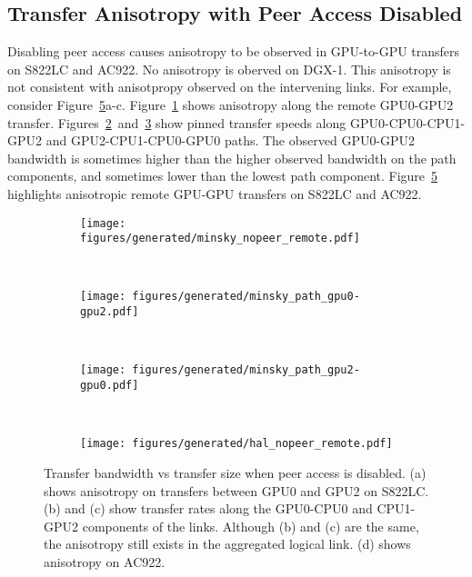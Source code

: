 \subsection{Transfer Anisotropy with Peer Access Disabled}
\label{sec:explicit-peer-direction}

Disabling peer access causes anisotropy to be observed in GPU-to-GPU transfers on S822LC and AC922.
No anisotropy is oberved on DGX-1.
This anisotropy is not consistent with anisotpropy observed on the intervening links.
For example, consider Figure~\ref{fig:explicit-peer-anisotropy}a-c.
Figure~\ref{fig:minsky-explicit-nopeer-remote} shows anisotropy along the remote GPU0-GPU2 transfer.
Figures~\ref{fig:minsky-explicit-path-gpu0-gpu2}~and~\ref{fig:minsky-explicit-path-gpu2-gpu0} show pinned transfer speeds along GPU0-CPU0-CPU1-GPU2 and GPU2-CPU1-CPU0-GPU0 paths.
The observed GPU0-GPU2 bandwidth is sometimes higher than the higher observed bandwidth on the path components, and sometimes lower than the lowest path component.
Figure~\ref{fig:explicit-peer-anisotropy} highlights anisotropic remote GPU-GPU transfers on S822LC and AC922.

\begin{figure}[ht]
    \centering
    \begin{subfigure}[b]{0.3\textwidth}
        \texttt{[image: figures/generated/minsky\_nopeer\_remote.pdf]}
        \caption{}
        \label{fig:minsky-explicit-nopeer-remote}
    \end{subfigure}
    ~
    \begin{subfigure}[b]{0.3\textwidth}
        \texttt{[image: figures/generated/minsky\_path\_gpu0-gpu2.pdf]}
        \caption{}
        \label{fig:minsky-explicit-path-gpu0-gpu2}
    \end{subfigure}
    ~
    \begin{subfigure}[b]{0.3\textwidth}
        \texttt{[image: figures/generated/minsky\_path\_gpu2-gpu0.pdf]}
        \caption{}
        \label{fig:minsky-explicit-path-gpu2-gpu0}
    \end{subfigure}
    \\
    \begin{subfigure}[b]{0.3\textwidth}
        \texttt{[image: figures/generated/hal\_nopeer\_remote.pdf]}
        \caption{}
        \label{fig:}
    \end{subfigure}
    \caption[]{
        Transfer bandwidth vs transfer size when peer access is disabled.
        (a) shows anisotropy on transfers between GPU0 and GPU2 on S822LC.
        (b) and (c) show transfer rates along the GPU0-CPU0 and CPU1-GPU2 components of the links.
        Although (b) and (c) are the same, the anisotropy still exists in the aggregated logical link.
        (d) shows anisotropy on AC922.
    }
    \label{fig:explicit-peer-anisotropy}
\end{figure}

